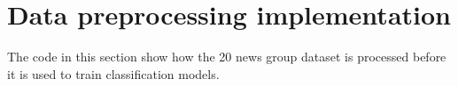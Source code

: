 \chapter{Data preprocessing implementation}
The code in this section show how the 20 news group dataset is processed before it is used to train classification models.\\


